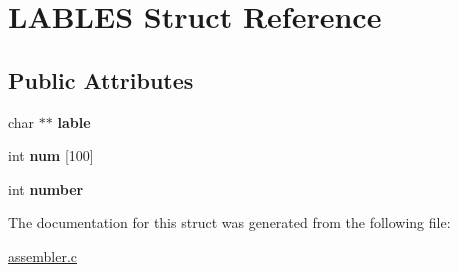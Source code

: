 \hypertarget{struct_l_a_b_l_e_s}{}\section{L\+A\+B\+L\+ES Struct Reference}
\label{struct_l_a_b_l_e_s}
\subsection*{Public Attributes}
\begin{DoxyCompactItemize}
\item 
\mbox{\label{struct_l_a_b_l_e_s_af72d9e475d8eb6a60b559bc1ff1b19b7}} 
char $\ast$$\ast$ {\bfseries lable}
\item 
\mbox{\label{struct_l_a_b_l_e_s_ab586f3e50704f111b1c53bb32895b8f4}} 
int {\bfseries num} \mbox{[}100\mbox{]}
\item 
\mbox{\label{struct_l_a_b_l_e_s_ac91c8d6291b57816fa3e6e0104a94d93}} 
int {\bfseries number}
\end{DoxyCompactItemize}


The documentation for this struct was generated from the following file\+:\begin{DoxyCompactItemize}
\item 
\mbox{\hyperlink{assembler_8c}{assembler.\+c}}\end{DoxyCompactItemize}
